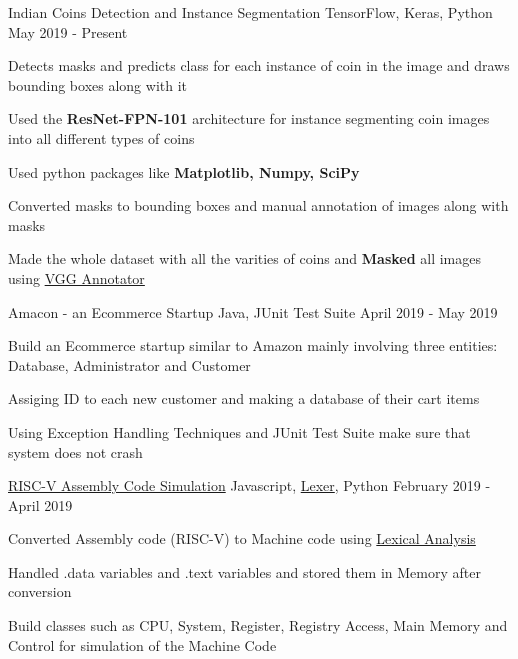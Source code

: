 \begin{cventries}
  \projects
    {} %
    {{Indian Coins Detection and Instance Segmentation}} %
    {TensorFlow, Keras, Python} %
    {May 2019 - Present} %
    {
      \begin{cvitems} %
        \item {Detects masks and predicts class for each instance of coin in the image and draws bounding boxes along with it}
        \item {Used the \textbf{ResNet-FPN-101} architecture for instance segmenting coin images into all different types of coins}
        \item {Used python packages like \textbf{Matplotlib, Numpy, SciPy}}
        \item {Converted masks to bounding boxes and manual annotation of images along with masks}
        \item {Made the whole dataset with all the varities of coins and \textbf{Masked} all images using \href{http://www.robots.ox.ac.uk/~vgg/software/via/}{VGG Annotator}}
      \end{cvitems}
    }
  \projects
{} %
 {Amacon - an Ecommerce Startup} %
 {Java, JUnit Test Suite} %
 {April 2019 - May 2019} %
 {
   \begin{cvitems} %
     \item {Build an Ecommerce startup similar to Amazon mainly involving three entities: Database, Administrator and Customer}
     \item {Assiging ID to each new customer and making a database of their cart items}
     \item {Using Exception Handling Techniques and JUnit Test Suite make sure that system does not crash}
   \end{cvitems}
 }

 \projects
{} %
 {\href{https://github.com/vinx-2105/assembly-simulator}{RISC-V Assembly Code Simulation}} %
 {Javascript, \href{https://github.com/aaditmshah/lexer}{Lexer}, Python} %
 {February 2019 - April 2019} %
 {
   \begin{cvitems} %
     \item {Converted Assembly code (RISC-V) to Machine code using \href{https://github.com/aaditmshah/lexer}{Lexical Analysis}}
     \item {Handled .data variables and .text variables and stored them in Memory after conversion}
     \item {Build classes such as CPU, System, Register, Registry Access, Main Memory and Control for simulation of the Machine Code}
   \end{cvitems}
 }



\end{cventries}
